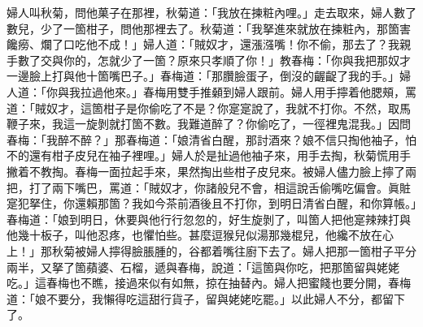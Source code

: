 婦人叫秋菊，問他菓子在那裡，秋菊道：「我放在揀粧內哩。」走去取來，婦人數了數兒，少了一箇柑子，{}問他那裡去了。秋菊道：「我拏進來就放在揀粧內，那箇害饞癆、爛了口吃他不成！」婦人道：「賊奴才，還漲漒嘴！你不偷，那去了？我親手數了交與你的，怎就少了一箇？原來只孝順了你！」教春梅：「你與我把那奴才一邊臉上打與他十箇嘴巴子。」春梅道：「那臢臉蛋子，倒沒的齷齪了我的手。」婦人道：「你與我拉過他來。」春梅用雙手推顙到婦人跟前。婦人用手擰着他腮頰，罵道：「賊奴才，這箇柑子是你偷吃了不是？你寔寔說了，我就不打你。不然，取馬鞭子來，我這一旋剝就打箇不數。我難道醉了？你偷吃了，一徑裡鬼混我。」因問春梅：「我醉不醉？」{}那春梅道：「娘清省白醒，那討酒來？{}娘不信只掏他袖子，怕不的還有柑子皮兒在袖子裡哩。」婦人於是扯過他袖子來，用手去掏，秋菊慌用手撇着不教掏。春梅一面拉起手來，果然掏出些柑子皮兒來。{}被婦人儘力臉上擰了兩把，打了兩下嘴巴，罵道：「賊奴才，你諸般兒不會，相這說舌偷嘴吃偏會。眞賍寔犯拏住，你還賴那箇？我如今茶前酒後且不打你，{}到明日清省白醒，和你算帳。」春梅道：「娘到明日，休要與他行行忽忽的，好生旋剝了，叫箇人把他寔辣辣打與他幾十板子，叫他忍疼，也懼怕些。甚麼逗猴兒似湯那幾棍兒，他纔不放在心上！」那秋菊被婦人擰得臉脹腫的，谷都着嘴往廚下去了。婦人把那一箇柑子平分兩半，又拏了箇蘋婆、石榴，遞與春梅，說道：「這箇與你吃，把那箇留與姥姥吃。」這春梅也不瞧，接過來似有如無，掠在抽替內。婦人把蜜餞也要分開，春梅道：「娘不要分，我懶得吃這甜行貨子，留與姥姥吃罷。」以此婦人不分，都留下了。

